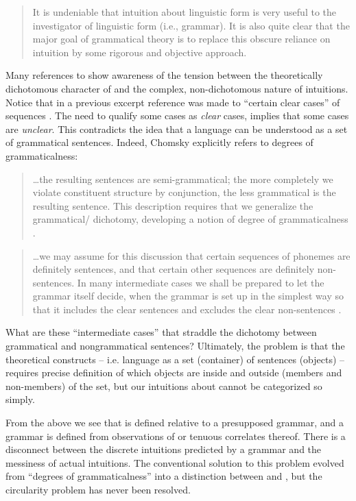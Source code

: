 \begin{quote}	
It is undeniable that intuition about linguistic form is very useful to the investigator of linguistic form (i.e., grammar). It is also quite clear that the major goal of grammatical theory is to replace this obscure reliance on intuition by some rigorous and objective approach. \citep[93-94]{Chomsky1957}
\end{quote}

  Many references to  show awareness of the tension between the theoretically dichotomous character of  and the complex, non-dichotomous nature of  intuitions. Notice that in a previous excerpt reference was made to “certain clear cases” of  sequences \citep[113]{Chomsky1956}. The need to qualify some cases as \textit{clear} cases, implies that some cases are \textit{unclear}. This contradicts the idea that a language can be understood as a set of grammatical sentences. Indeed, Chomsky explicitly refers to degrees of grammaticalness: 

\begin{quote}	
…the resulting sentences are semi-grammatical; the more completely we violate constituent structure by conjunction, the less grammatical is the resulting sentence. This description requires that we generalize the grammatical/ dichotomy, developing a notion of degree of grammaticalness \citep[36]{Chomsky1957}.
\end{quote}

\begin{quote}	
…we may assume for this discussion that certain sequences of phonemes are definitely sentences, and that certain other sequences are definitely non-sentences. In many intermediate cases we shall be prepared to let the grammar itself decide, when the grammar is set up in the simplest way so that it includes the clear sentences and excludes the clear non-sentences \citep[14]{Chomsky1957}.
\end{quote}

  What are these “intermediate cases” that straddle the dichotomy between grammatical and nongrammatical sentences? Ultimately, the problem is that the theoretical constructs -- i.e. language as a set (container) of sentences (objects) -- requires precise definition of which objects are inside and outside (members and non-members) of the set, but our intuitions about  cannot be categorized so simply.

  From the above we see that  is defined relative to a presupposed grammar, and a grammar is defined from observations of  or tenuous correlates thereof. There is a disconnect between the discrete intuitions predicted by a grammar and the messiness of actual intuitions. The conventional solution to this problem evolved from “degrees of grammaticalness” into a distinction between  and , but the circularity problem has never been resolved. 

